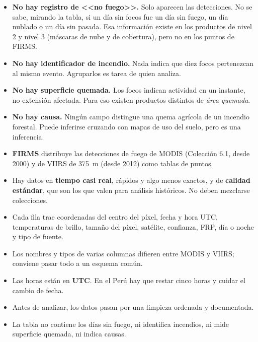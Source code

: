 \begin{itemize}
  \item \textbf{No hay registro de <<no fuego>>.} Solo aparecen las detecciones. No se sabe,
  mirando la tabla, si un día sin focos fue un día sin fuego, un día nublado o un día sin
  pasada. Esa información existe en los productos de nivel 2 y nivel 3 (máscaras de nube y de
  cobertura), pero no en los puntos de FIRMS.
  \item \textbf{No hay identificador de incendio.} Nada indica que diez focos pertenezcan al
  mismo evento. Agruparlos es tarea de quien analiza.
  \item \textbf{No hay superficie quemada.} Los focos indican actividad en un instante, no
  extensión afectada. Para eso existen productos distintos de \emph{área quemada}.
  \item \textbf{No hay causa.} Ningún campo distingue una quema agrícola de un incendio
  forestal. Puede inferirse cruzando con mapas de uso del suelo, pero es una inferencia.
\end{itemize}

\resumen

\begin{itemize}
  \item \textbf{FIRMS} distribuye las detecciones de fuego de MODIS (Colección 6.1, desde 2000)
  y de VIIRS de 375~m (desde 2012) como tablas de puntos.
  \item Hay datos en \textbf{tiempo casi real}, rápidos y algo menos exactos, y de
  \textbf{calidad estándar}, que son los que valen para análisis históricos. No deben mezclarse
  colecciones.
  \item Cada fila trae coordenadas del centro del píxel, fecha y hora UTC, temperaturas de
  brillo, tamaño del píxel, satélite, confianza, FRP, día o noche y tipo de fuente.
  \item Los nombres y tipos de varias columnas difieren entre MODIS y VIIRS; conviene pasar todo
  a un esquema común.
  \item Las horas están en \textbf{UTC}. En el Perú hay que restar cinco horas y cuidar el
  cambio de fecha.
  \item Antes de analizar, los datos pasan por una limpieza ordenada y documentada.
  \item La tabla no contiene los días sin fuego, ni identifica incendios, ni mide superficie
  quemada, ni indica causas.
\end{itemize}

\ejercicios

